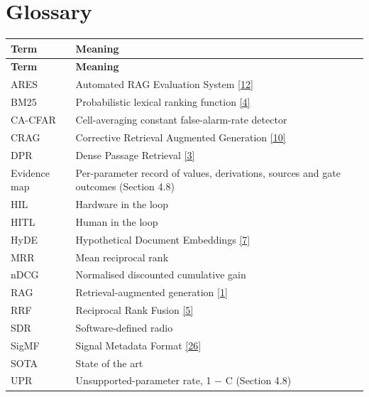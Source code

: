 \documentclass[11pt,a4paper]{article}
\begin{document}
\section{Glossary}
{\small
\begin{longtable}{>{\raggedright\arraybackslash}p{}>{\raggedright\arraybackslash}p{}}
\toprule
\rowcolor{headbg} \textbf{Term} & \textbf{Meaning} \\
\midrule
\endfirsthead
\toprule
\rowcolor{headbg} \textbf{Term} & \textbf{Meaning} \\
\midrule
\endhead
\bottomrule
\endlastfoot
ARES & Automated RAG Evaluation System \hyperlink{ref12}{[12]} \\ \arrayrulecolor{rulec}\hline\arrayrulecolor{black}
BM25 & Probabilistic lexical ranking function \hyperlink{ref4}{[4]} \\ \arrayrulecolor{rulec}\hline\arrayrulecolor{black}
CA-CFAR & Cell-averaging constant false-alarm-rate detector \\ \arrayrulecolor{rulec}\hline\arrayrulecolor{black}
CRAG & Corrective Retrieval Augmented Generation \hyperlink{ref10}{[10]} \\ \arrayrulecolor{rulec}\hline\arrayrulecolor{black}
DPR & Dense Passage Retrieval \hyperlink{ref3}{[3]} \\ \arrayrulecolor{rulec}\hline\arrayrulecolor{black}
Evidence map & Per-parameter record of values, derivations, sources and gate outcomes (Section 4.8) \\ \arrayrulecolor{rulec}\hline\arrayrulecolor{black}
HIL & Hardware in the loop \\ \arrayrulecolor{rulec}\hline\arrayrulecolor{black}
HITL & Human in the loop \\ \arrayrulecolor{rulec}\hline\arrayrulecolor{black}
HyDE & Hypothetical Document Embeddings \hyperlink{ref7}{[7]} \\ \arrayrulecolor{rulec}\hline\arrayrulecolor{black}
MRR & Mean reciprocal rank \\ \arrayrulecolor{rulec}\hline\arrayrulecolor{black}
nDCG & Normalised discounted cumulative gain \\ \arrayrulecolor{rulec}\hline\arrayrulecolor{black}
RAG & Retrieval-augmented generation \hyperlink{ref1}{[1]} \\ \arrayrulecolor{rulec}\hline\arrayrulecolor{black}
RRF & Reciprocal Rank Fusion \hyperlink{ref5}{[5]} \\ \arrayrulecolor{rulec}\hline\arrayrulecolor{black}
SDR & Software-defined radio \\ \arrayrulecolor{rulec}\hline\arrayrulecolor{black}
SigMF & Signal Metadata Format \hyperlink{ref26}{[26]} \\ \arrayrulecolor{rulec}\hline\arrayrulecolor{black}
SOTA & State of the art \\ \arrayrulecolor{rulec}\hline\arrayrulecolor{black}
UPR & Unsupported-parameter rate, 1 \ensuremath{-} C (Section 4.8) \\
\end{longtable}
}
\end{document}
